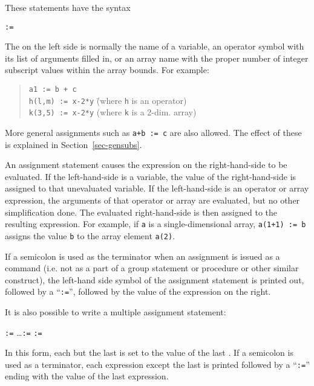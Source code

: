 \label{reserved:assignop}

These statements
 have the syntax
\begin{syntax}
     \bnfprod {} \texttt{:=} 
\end{syntax}
The  on the left side is normally the name of a variable, an
operator symbol with its list of arguments filled in, or an array name with
the proper number of integer subscript values within the array bounds. For
example:
\begin{quote}
\begin{tabbing}
\texttt{a1 := b + c} \\
\texttt{h(l,m) := x-2*y} \hspace{1in} \= (where \texttt{h} is an operator) \\
\texttt{k(3,5) := x-2*y} \> (where \texttt{k} is a 2-dim. array)
\end{tabbing}
\end{quote}
More general assignments such as \texttt{a+b := c} are also
allowed.  The effect of these is explained in Section~\ref{sec-gensubs}.

An assignment statement causes the expression on the right-hand-side to be
evaluated.  If the left-hand-side is a variable, the value of the
right-hand-side is assigned to that unevaluated variable.  If the
left-hand-side is an operator or array expression, the arguments of that
operator or array are evaluated, but no other simplification done.  The
evaluated right-hand-side is then assigned to the resulting expression.
For example, if \texttt{a} is a single-dimensional array, \texttt{a(1+1) := b}
assigns the value \texttt{b} to the array element \texttt{a(2)}.

If a semicolon is used as the terminator when an assignment
 is issued as a command (i.e. not as a part of a group
statement or procedure or other similar construct), the left-hand side
symbol of the assignment statement is printed out, followed by a
``\texttt{:=}'', followed by the value of the expression on the right.

It is also possible to write a multiple assignment statement:
\begin{syntax}
     \texttt{:=} \dots \texttt{:=}  \texttt{:=} 
\end{syntax}
In this form, each  but the last is set to the value of
the last .  If a semicolon is used as a terminator, each
expression except the last is printed followed by a ``\texttt{:=}'' ending
with the value of the last expression.


